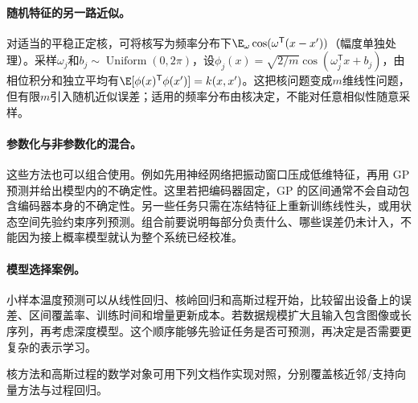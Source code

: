 \paragraph{随机特征的另一路近似。}
对适当的平稳正定核，可将核写为频率分布下$\E_\omega\cos(\omega^{\mathsf T}(x-x'))$（幅度单独处理）。采样$\omega_j$和$b_j\sim\operatorname{Uniform}(0,2\pi)$，设$\phi_j(x)=\sqrt{2/m}\cos(\omega_j^{\mathsf T}x+b_j)$，由相位积分和独立平均有$\E[\phi(x)^{\mathsf T}\phi(x')]=k(x,x')$。这把核问题变成$m$维线性问题，但有限$m$引入随机近似误差；适用的频率分布由核决定，不能对任意相似性随意采样。

\paragraph{参数化与非参数化的混合。}
这些方法也可以组合使用。例如先用神经网络把振动窗口压成低维特征，再用 GP 预测并给出模型内的不确定性。这里若把编码器固定，GP 的区间通常不会自动包含编码器本身的不确定性。另一些任务只需在冻结特征上重新训练线性头，或用状态空间先验约束序列预测。组合前要说明每部分负责什么、哪些误差仍未计入，不能因为接上概率模型就认为整个系统已经校准。

\paragraph{模型选择案例。}
小样本温度预测可以从线性回归、核岭回归和高斯过程开始，比较留出设备上的误差、区间覆盖率、训练时间和增量更新成本。若数据规模扩大且输入包含图像或长序列，再考虑深度模型。这个顺序能够先验证任务是否可预测，再决定是否需要更复杂的表示学习。

核方法和高斯过程的数学对象可用下列文档作实现对照，分别覆盖核近邻/支持向量方法与过程回归。
